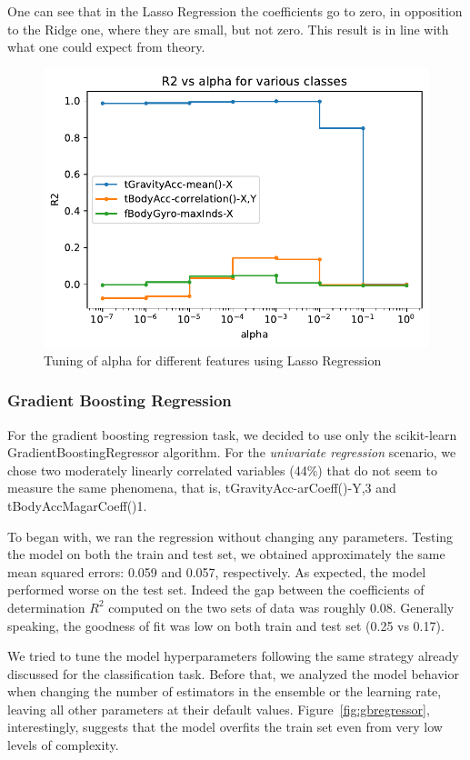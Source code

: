 \documentclass[10pt, a4paper, twocolumn]{article}
\begin{document}
One can see that in the Lasso Regression the coefficients go to zero, in opposition to the Ridge one, where they are small, but not zero. This result is in line with what one could expect from theory.

\begin{figure}[h]
    \centering
    \includegraphics[width=0.6\columnwidth]{alpha_tuning.pdf}
    \caption{Tuning of alpha for different features using Lasso Regression}
    \label{fig:tuning_lasso}
\end{figure}

\subsubsection*{Gradient Boosting Regression}

For the gradient boosting regression task, we decided to use only the scikit-learn GradientBoostingRegressor algorithm. For the \textit{univariate regression} scenario, we chose two moderately linearly correlated variables (44\%) that do not seem to measure the same phenomena, that is, tGravityAcc-arCoeff()-Y,3 and tBodyAccMagarCoeff()1.

To began with, we ran the regression without changing any parameters. Testing the model on both the train and test set, we obtained approximately the same mean squared errors: 0.059 and 0.057, respectively. As expected, the model performed worse on the test set. Indeed the gap between the coefficients of determination $R^2$ computed on the two sets of data was roughly 0.08. Generally speaking, the goodness of fit was low on both train and test set (0.25 vs 0.17).

We tried to tune the model hyperparameters following the same strategy already discussed for the classification task. Before that, we analyzed the model behavior when changing the number of estimators in the ensemble or the learning rate, leaving all other parameters at their default values. Figure~\ref{fig:gbregressor}, interestingly, suggests that the model overfits the train set even from very low levels of complexity. 
\end{document}
